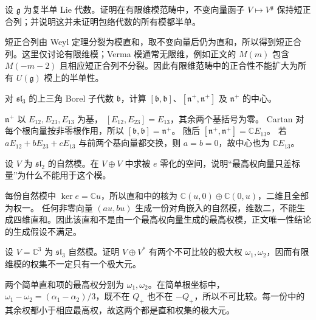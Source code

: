 \begin{exercise}\label{b5:ex:18-invariants-exact}
	设 \(\mathfrak g\) 为复半单 Lie 代数。证明在有限维模范畴中，不变向量函子 \(V\mapsto V^{\mathfrak g}\) 保持短正合列；并说明这并未证明包络代数的所有模都半单。
\end{exercise}
\begin{solution}
	短正合列由 Weyl 定理分裂为模直和，取不变向量后仍为直和，所以得到短正合列。这里仅讨论有限维模；Verma 模通常无限维，例如正文的 \(M(m)\) 包含 \(M(-m-2)\) 且相应短正合列不分裂。因此有限维范畴中的正合性不能扩大为所有 \(U(\mathfrak g)\) 模上的半单性。
\end{solution}

\begin{exercise}\label{b5:ex:18-borel-sl3}
	对 \(\mathfrak{sl}_3\) 的上三角 Borel 子代数 \(\mathfrak b\)，计算 \([\mathfrak b,\mathfrak b]\)、\([\mathfrak n^+,\mathfrak n^+]\) 及 \(\mathfrak n^+\) 的中心。
\end{exercise}
\begin{solution}
	\(\mathfrak n^+\) 以 \(E_{12},E_{23},E_{13}\) 为基， \([E_{12},E_{23}]=E_{13}\)，其余两个基括号为零。 Cartan 对每个根向量按非零根作用，所以 \([\mathfrak b,\mathfrak b]=\mathfrak n^+\)。 随后 \([\mathfrak n^+,\mathfrak n^+]=\mathbb CE_{13}\)。 若 \(aE_{12}+bE_{23}+cE_{13}\) 与前两个基向量都交换，则 \(a=b=0\)，故中心也为 \(\mathbb CE_{13}\)。
\end{solution}

\begin{exercise}\label{b5:ex:18-two-highest-vectors}
	设 \(V\) 为 \(\mathfrak{sl}_2\) 的自然模。在 \(V\oplus V\) 中求被 \(e\) 零化的空间，说明“最高权向量只差标量”为什么不能用于这个模。
\end{exercise}
\begin{solution}
	每份自然模中 \(\ker e=\mathbb Cu\)，所以直和中的核为 \(\mathbb C(u,0)\oplus\mathbb C(0,u)\)，二维且全部为权一。 任何非零向量 \((au,bu)\) 生成一份对角嵌入的自然模，维数二，不能生成四维直和。因此该直和不是由一个最高权向量生成的最高权模，正文唯一性结论的生成假设不满足。
\end{solution}

\begin{exercise}\label{b5:ex:18-incomparable-highest}
	设 \(V=\mathbb C^3\) 为 \(\mathfrak{sl}_3\) 自然模。证明 \(V\oplus V^*\) 有两个不可比较的极大权 \(\omega_1,\omega_2\)，因而有限维模的权集不一定只有一个极大元。
\end{exercise}
\begin{solution}
	两个简单直和项的最高权分别为 \(\omega_1,\omega_2\)。在简单根坐标中， \(\omega_1-\omega_2=(\alpha_1-\alpha_2)/3\)，既不在 \(Q_+\) 也不在 \(-Q_+\)，所以不可比较。每一份中的其余权都小于相应最高权，故这两个都是直和权集的极大元。
\end{solution}

